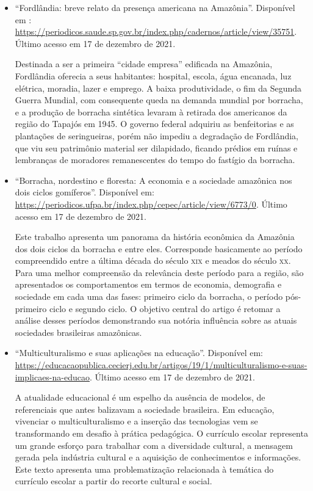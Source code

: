 \documentclass[11pt]{extarticle}
\begin{document}
\begin{itemize}
	\item ``Fordlândia: breve relato da presença americana na Amazônia''. Disponível em : \url{https://periodicos.saude.sp.gov.br/index.php/cadernos/article/view/35751}. Último acesso em 17 de dezembro de 2021.

	Destinada a ser a primeira “cidade empresa” edificada na Amazônia, Fordlândia oferecia a seus habitantes: hospital, escola, água encanada, luz elétrica, moradia, lazer e emprego. A baixa produtividade, o fim da Segunda Guerra Mundial, com consequente queda na demanda mundial por borracha, e a produção de borracha sintética levaram à retirada dos americanos da região do Tapajós em 1945. O governo federal adquiriu as benfeitorias e as plantações de seringueiras, porém não impediu a degradação de Fordlândia, que viu seu patrimônio material ser dilapidado, ficando prédios em ruínas e lembranças de moradores remanescentes do tempo do fastígio da borracha. 


	\item ``Borracha, nordestino e floresta: A economia e a sociedade amazônica nos dois ciclos gomíferos''. Disponível em: \url{https://periodicos.ufpa.br/index.php/cepec/article/view/6773/0}. Último acesso em 17 de dezembro de 2021.
	
	Este trabalho apresenta um panorama da história econômica da Amazônia dos dois ciclos da borracha e entre eles. Corresponde basicamente ao período compreendido entre a última década do século \textsc{xix} e meados do século \textsc{xx}. Para uma melhor compreensão da relevância deste período para a região, são apresentados os comportamentos em termos de economia, demografia e sociedade em cada uma das fases: primeiro ciclo da borracha, o período pós-primeiro ciclo e segundo ciclo. O objetivo central do artigo é retomar a análise desses períodos demonstrando sua notória influência sobre as atuais sociedades brasileiras amazônicas.

	\item ``Multiculturalismo e suas aplicações na educação''. Disponível em: \url{https://educacaopublica.cecierj.edu.br/artigos/19/1/multiculturalismo-e-suas-implicaes-na-educao}. Último acesso em 17 de dezembro de 2021.

	A atualidade educacional é um espelho da ausência de modelos, de referenciais que antes balizavam a sociedade brasileira. Em educação, vivenciar o multiculturalismo e a inserção das tecnologias vem se transformando em desafio à prática pedagógica. O currículo escolar representa um grande esforço para trabalhar com a diversidade cultural, a mensagem gerada pela indústria cultural e a aquisição de conhecimentos e informações. Este texto apresenta uma problematização relacionada à temática do currículo escolar a partir do recorte cultural e social.
\end{itemize}
\end{document}
